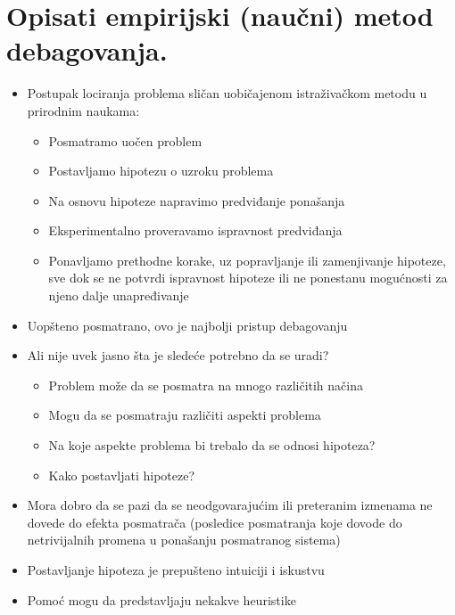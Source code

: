 \documentclass[a4paper]{article}
\begin{document}
\section{Opisati empirijski (naučni) metod debagovanja.}
  \begin{itemize}
    \item Postupak lociranja problema sličan uobičajenom istraživačkom metodu u prirodnim naukama:
      \begin{itemize}
        \item Posmatramo uočen problem
        \item Postavljamo hipotezu o uzroku problema
        \item Na osnovu hipoteze napravimo predviđanje ponašanja
        \item Eksperimentalno proveravamo ispravnost predviđanja
        \item Ponavljamo prethodne korake, uz popravljanje ili zamenjivanje hipoteze, sve dok se ne potvrdi ispravnost hipoteze ili ne ponestanu mogućnosti za njeno dalje unapređivanje
      \end{itemize}
    \item Uopšteno posmatrano, ovo je najbolji pristup debagovanju
    \item Ali nije uvek jasno šta je sledeće potrebno da se uradi?
      \begin{itemize}
        \item Problem može da se posmatra na mnogo različitih načina
        \item Mogu da se posmatraju različiti aspekti problema
        \item Na koje aspekte problema bi trebalo da se odnosi hipoteza?
        \item Kako postavljati hipoteze?
      \end{itemize}
    \item Mora dobro da se pazi da se neodgovarajućim ili preteranim izmenama ne dovede do efekta posmatrača (posledice posmatranja koje dovode do netrivijalnih promena u ponašanju posmatranog sistema)
    \item Postavljanje hipoteza je prepušteno intuiciji i iskustvu
    \item Pomoć mogu da predstavljaju nekakve heuristike
  \end{itemize}
\end{document}
